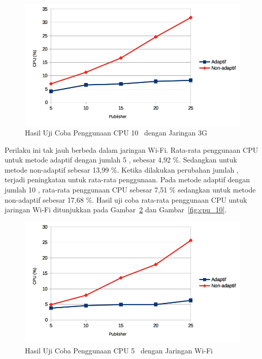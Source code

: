 \begin{figure}
  \centering
  \includegraphics[scale=0.90]
	{images/4-3gcpu10.png}
	\caption{Hasil Uji Coba Penggunaan CPU 10 \Subscriber~dengan Jaringan 3G}
	\label{fig:3gcpu_10}
\end{figure}

Perilaku ini tak jauh berbeda dalam jaringan Wi-Fi. Rata-rata penggunaan CPU
untuk metode adaptif dengan jumlah 5 \subscriber, sebesar 4,92 \%. Sedangkan
untuk metode non-adaptif sebesar 13,99 \%. Ketika dilakukan perubahan jumlah
\subscriber, terjadi peningkatan untuk rata-rata penggunaan. Pada metode adaptif
dengan jumlah 10 \subscriber, rata-rata penggunaan CPU sebesar 7,51 \% sedangkan
untuk metode non-adaptif sebesar 17,68 \%. Hasil uji coba rata-rata penggunaan
CPU untuk jaringan Wi-Fi ditunjukkan pada Gambar~\ref{fig:cpu_5} dan
Gambar~\ref{fig:cpu_10}.

\noindent
\begin{figure}
  \centering
  \includegraphics[scale=0.90]
	{images/4-cpu5.png}
	\caption{Hasil Uji Coba Penggunaan CPU 5 \Subscriber~dengan Jaringan Wi-Fi}
\label{fig:cpu_5}
\end{figure}
\noindent


